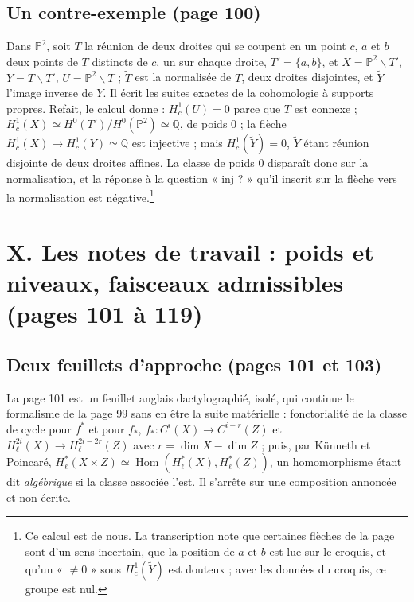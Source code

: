 \documentclass[11pt,a4paper]{article}
\begin{document}
\subsection*{Un contre-exemple (page 100)}

Dans $\mathbb{P}^{2}$, soit $T$ la réunion de deux droites qui se coupent en un
point $c$, $a$ et $b$ deux points de $T$ distincts de $c$, un sur chaque droite,
$T' = \{a, b\}$, et $X = \mathbb{P}^{2} \smallsetminus T'$, $Y = T \smallsetminus
T'$, $U = \mathbb{P}^{2} \smallsetminus T$ ; $\widetilde{T}$ est la normalisée de
$T$, deux droites disjointes, et $\widetilde{Y}$ l'image inverse de $Y$. Il écrit
les suites exactes de la cohomologie à supports propres. Refait, le calcul donne :
$H^{1}_{c}(U) = 0$ parce que $T$ est connexe ; $H^{1}_{c}(X) \simeq
H^{0}(T')/H^{0}(\mathbb{P}^{2}) \simeq \mathbb{Q}$, de poids $0$ ; la flèche
$H^{1}_{c}(X) \to H^{1}_{c}(Y) \simeq \mathbb{Q}$ est injective ; mais
$H^{1}_{c}(\widetilde{Y}) = 0$, $\widetilde{Y}$ étant réunion disjointe de deux
droites affines. La classe de poids $0$ disparaît donc sur la normalisation, et
la réponse à la question « inj ? » qu'il inscrit sur la flèche vers la
normalisation est négative.\footnote{Ce calcul est de nous. La transcription note
que certaines flèches de la page sont d'un sens incertain, que la position de
$a$ et $b$ est lue sur le croquis, et qu'un « $\neq 0$ » sous
$H^{1}_{c}(\widetilde{Y})$ est douteux ; avec les données du croquis, ce groupe
est nul.}

\section*{X. Les notes de travail : poids et niveaux, faisceaux admissibles (pages 101 à 119)}

\subsection*{Deux feuillets d'approche (pages 101 et 103)}

La page 101 est un feuillet anglais dactylographié, isolé, qui continue le
formalisme de la page 99 sans en être la suite matérielle : fonctorialité de la
classe de cycle pour $f^{*}$ et pour $f_{*}$, $f_{*} \colon C^{i}(X) \to
C^{i-r}(Z)$ et $H^{2i}_{\ell}(X) \to H^{2i-2r}_{\ell}(Z)$ avec $r = \dim X - \dim Z$ ;
puis, par Künneth et Poincaré, $H^{*}_{\ell}(X \times Z) \simeq
\operatorname{Hom}(H^{*}_{\ell}(X), H^{*}_{\ell}(Z))$, un homomorphisme étant dit
\emph{algébrique} si la classe associée l'est. Il s'arrête sur une composition
annoncée et non écrite.
\end{document}
